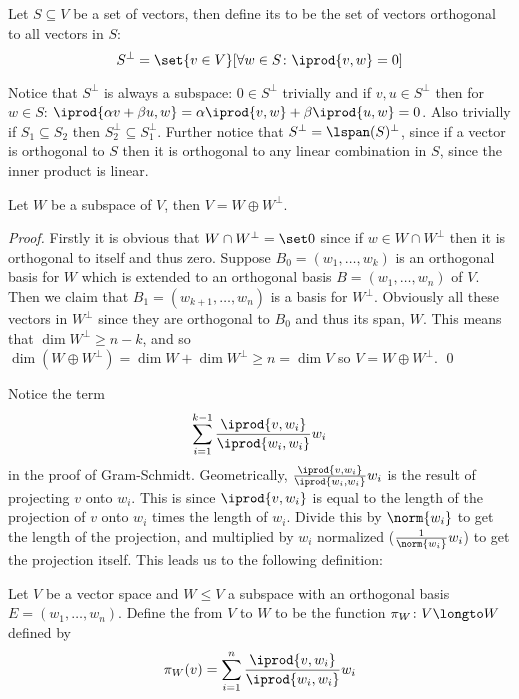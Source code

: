 \begin{defn*}

    Let $S\subseteq V$ be a set of vectors, then define its  to be the set of vectors orthogonal to all vectors in $S$:
    \[ S^\perp = \set{v\in V}[\forall w\in S\colon\iprod{v,w}=0] \]

\end{defn*}

Notice that $S^\perp$ is always a subspace: $0\in S^\perp$ trivially and if $v,u\in S^\perp$ then for $w\in S$: $\iprod{\alpha v+\beta u,w}=\alpha\iprod{v,w}+\beta\iprod{u,w}=0$.
Also trivially if $S_1\subseteq S_2$ then $S_2^\perp\subseteq S_1^\perp$.
Further notice that $S^\perp=\lspan(S)^\perp$, since if a vector is orthogonal to $S$ then it is orthogonal to any linear combination in $S$, since the inner product is linear.

\begin{thrm*}

    Let $W$ be a subspace of $V$, then $V=W\oplus W^\perp$.

\end{thrm*}

\begin{proof}

    Firstly it is obvious that $W\cap W^\perp=\set0$ since if $w\in W\cap W^\perp$ then it is orthogonal to itself and thus zero.
    Suppose $B_0=(w_1,\dots,w_k)$ is an orthogonal basis for $W$ which is extended to an orthogonal basis $B=(w_1,\dots,w_n)$ of $V$.
    Then we claim that $B_1=(w_{k+1},\dots,w_n)$ is a basis for $W^\perp$.
    Obviously all these vectors in $W^\perp$ since they are orthogonal to $B_0$ and thus its span, $W$.
    This means that $\dim W^\perp \geq n-k$, and so $\dim(W\oplus W^\perp)=\dim W+\dim W^\perp\geq n=\dim V$ so $V=W\oplus W^\perp$.
    \qed

\end{proof}

Notice the term
\[ \sum_{i=1}^{k-1}\frac{\iprod{v,w_i}}{\iprod{w_i,w_i}}w_i \]
in the proof of Gram-Schmidt.
Geometrically, $\frac{\iprod{v,w_i}}{\iprod{w_i,w_i}}w_i$ is the result of projecting $v$ onto $w_i$.
This is since $\iprod{v,w_i}$ is equal to the length of the projection of $v$ onto $w_i$ times the length of $w_i$.
Divide this by $\norm{w_i}$ to get the length of the projection, and multiplied by $w_i$ normalized ($\frac1{\norm{w_i}}w_i$) to get the projection itself.
This leads us to the following definition:

\begin{defn*}

    Let $V$ be a vector space and $W\leq V$ a subspace with an orthogonal basis $E=(w_1,\dots,w_n)$.
    Define the  from $V$ to $W$ to be the function $\pi_W\colon V\longto W$ defined by
    \[ \pi_W(v) = \sum_{i=1}^n\frac{\iprod{v,w_i}}{\iprod{w_i,w_i}}w_i \]

\end{defn*}

